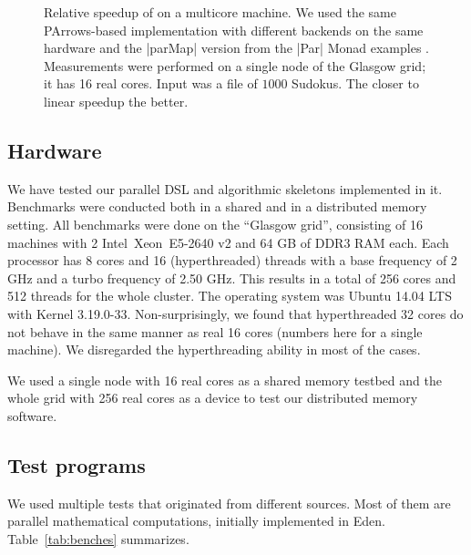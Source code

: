 \begin{figure}
\centering
%
{\label{1231231232}}%
{\label{1231231123122}}
\caption{Relative speedup of \rmtest on a multicore machine. We used the same PArrows-based implementation with
  different backends on the same hardware and the |parMap| version from the |Par| Monad examples \citet{par-monad}. Measurements were performed on a single node of the Glasgow
  grid; it has 16 real cores. Input was a file of $1000$ Sudokus. The
  closer to linear speedup the better.}
\label{1231231233122}
\end{figure}





\subsection{Hardware}

We have tested our parallel DSL and algorithmic skeletons implemented
in it. Benchmarks were conducted both in a shared and in a distributed
memory setting. All benchmarks were done on the ``Glasgow grid'', consisting of
16 machines with 2 Intel\SymbReg~Xeon\SymbReg~E5-2640 v2 and 64 GB of DDR3 RAM each. Each processor has 8 cores and 16 (hyperthreaded) threads with a base frequency of 2 GHz and a turbo frequency of 2.50 GHz. This results in a total of 256 cores and 512 threads for the whole cluster. The operating system was Ubuntu 14.04 LTS with Kernel 3.19.0-33. Non-surprisingly, we found that hyperthreaded 32 cores do not behave in the same manner as real 16 cores (numbers here for a single machine). We disregarded the hyperthreading ability in most of the
cases.

We used a single node with 16 real cores as a shared memory testbed
and the whole grid with 256 real cores as a device to test our
distributed memory software.

\subsection{Test programs}

We used multiple tests that originated from different
sources. Most of them are parallel mathematical computations, initially
implemented in Eden. Table~\ref{tab:benches} summarizes.

